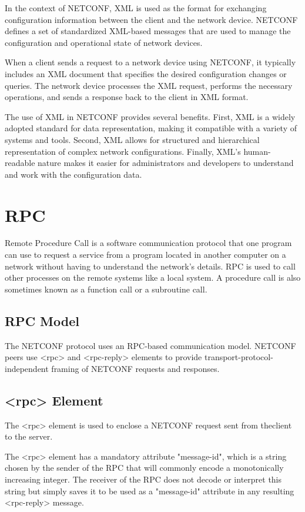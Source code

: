 In the context of NETCONF, XML is used as the format for exchanging configuration information between the client and the network device. NETCONF defines a set of standardized XML-based messages that are used to manage the configuration and operational state of network devices.

When a client sends a request to a network device using NETCONF, it typically includes an XML document that specifies the desired configuration changes or queries. The network device processes the XML request, performs the necessary operations, and sends a response back to the client in XML format.

The use of XML in NETCONF provides several benefits. First, XML is a widely adopted standard for data representation, making it compatible with a variety of systems and tools. Second, XML allows for structured and hierarchical representation of complex network configurations. Finally, XML's human-readable nature makes it easier for administrators and developers to understand and work with the configuration data.


\section{RPC}
Remote Procedure Call is a software communication protocol that one program can use to request a service from a program located in another computer on a network without having to understand the network's details. RPC is used to call other processes on the remote systems like a local system. A procedure call is also sometimes known as a function call or a subroutine call.
\subsection*{RPC Model}
The NETCONF protocol uses an RPC-based communication model.  NETCONF peers use \textless{rpc}\textgreater{} and \textless{rpc-reply}\textgreater{} elements to provide transport-protocol-independent framing of NETCONF requests and responses.

\subsection*{\textless{rpc}\textgreater{} Element}
The \textless{rpc}\textgreater{} element is used to enclose a NETCONF request sent from theclient to the server.

The \textless{rpc}\textgreater{} element has a mandatory attribute "message-id", which is a
   string chosen by the sender of the RPC that will commonly encode a
   monotonically increasing integer.  The receiver of the RPC does not
   decode or interpret this string but simply saves it to be used as a
   "message-id" attribute in any resulting \textless{rpc-reply}\textgreater{} message. 

